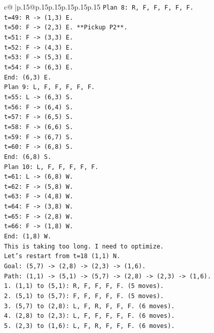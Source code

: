 \documentclass{article}
\begin{document}
{\begin{supertabular}{c@{$\;$}|p{.15\linewidth}@{}p{.15\linewidth}p{.15\linewidth}p{.15\linewidth}p{.15\linewidth}p{.15\linewidth}}
{{{\texttt{Plan 8: R, F, F, F, F, F.} \\
\texttt{t=49: R {-}> (1,3) E.} \\
\texttt{t=50: F {-}> (2,3) E. **Pickup P2**.} \\
\texttt{t=51: F {-}> (3,3) E.} \\
\texttt{t=52: F {-}> (4,3) E.} \\
\texttt{t=53: F {-}> (5,3) E.} \\
\texttt{t=54: F {-}> (6,3) E.} \\
\texttt{End: (6,3) E.} \\
\texttt{Plan 9: L, F, F, F, F, F.} \\
\texttt{t=55: L {-}> (6,3) S.} \\
\texttt{t=56: F {-}> (6,4) S.} \\
\texttt{t=57: F {-}> (6,5) S.} \\
\texttt{t=58: F {-}> (6,6) S.} \\
\texttt{t=59: F {-}> (6,7) S.} \\
\texttt{t=60: F {-}> (6,8) S.} \\
\texttt{End: (6,8) S.} \\
\texttt{Plan 10: L, F, F, F, F, F.} \\
\texttt{t=61: L {-}> (6,8) W.} \\
\texttt{t=62: F {-}> (5,8) W.} \\
\texttt{t=63: F {-}> (4,8) W.} \\
\texttt{t=64: F {-}> (3,8) W.} \\
\texttt{t=65: F {-}> (2,8) W.} \\
\texttt{t=66: F {-}> (1,8) W.} \\
\texttt{End: (1,8) W.} \\
\texttt{This is taking too long. I need to optimize.} \\
\texttt{Let's restart from t=18 (1,1) N.} \\
\texttt{Goal: (5,7) {-}> (2,8) {-}> (2,3) {-}> (1,6).} \\
\texttt{Path: (1,1) {-}> (5,1) {-}> (5,7) {-}> (2,8) {-}> (2,3) {-}> (1,6).} \\
\texttt{1. (1,1) to (5,1): R, F, F, F, F. (5 moves).} \\
\texttt{2. (5,1) to (5,7): F, F, F, F, F. (5 moves).} \\
\texttt{3. (5,7) to (2,8): L, F, R, F, F, F. (6 moves).} \\
\texttt{4. (2,8) to (2,3): L, F, F, F, F, F. (6 moves).} \\
\texttt{5. (2,3) to (1,6): L, F, R, F, F, F. (6 moves).} \\
}}}
\end{supertabular}}
\end{document}
